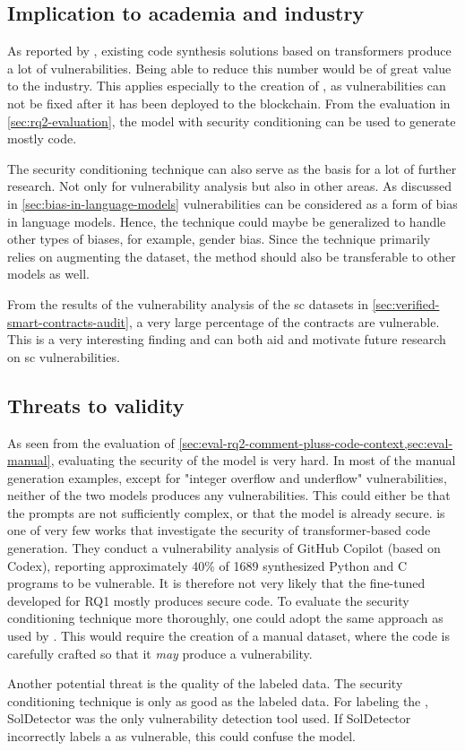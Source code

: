 \subsection{Implication to academia and industry}
\label{sec:rq2-implication-to-academia-industry}
As reported by \textcite{pearch2021asleep}, existing code synthesis solutions based on transformers produce a lot of vulnerabilities. Being able to reduce this number would be of great value to the industry. This applies especially to the creation of , as vulnerabilities can not be fixed after it has been deployed to the blockchain. From the evaluation in \cref{sec:rq2-evaluation}, the model with security conditioning can be used to generate  mostly  code.

The security conditioning technique can also serve as the basis for a lot of further research. Not only for vulnerability analysis but also in other areas. As discussed in \cref{sec:bias-in-language-models} vulnerabilities can be considered as a form of bias in language models. Hence, the technique could maybe be generalized to handle other types of biases, for example, gender bias. Since the technique primarily relies on augmenting the dataset, the method should also be transferable to other models as well.

From the results of the vulnerability analysis of the \acrshort{sc} datasets in \cref{sec:verified-smart-contracts-audit}, a very large percentage of the  contracts are vulnerable. This is a very interesting finding and can both aid and motivate future research on \acrshort{sc} vulnerabilities.

\subsection{Threats to validity}
\label{sec:rq2-threats-to-validity}
As seen from the evaluation of \cref{sec:eval-rq2-comment-pluss-code-context,sec:eval-manual}, evaluating the security of the model is very hard. In most of the manual generation examples, except for "integer overflow and underflow" vulnerabilities, neither of the two models produces any vulnerabilities. This could either be that the prompts are not sufficiently complex, or that the model is already secure. \textcite{pearch2021asleep} is one of very few works that investigate the security of transformer-based code generation. They conduct a vulnerability analysis of GitHub Copilot (based on Codex), reporting approximately 40\% of 1689 synthesized Python and C programs to be vulnerable. It is therefore not very likely that the fine-tuned developed for RQ1 mostly produces secure code. To evaluate the security conditioning technique more thoroughly, one could adopt the same approach as used by \cite{pearch2021asleep}. This would require the creation of a manual dataset, where the code is carefully crafted so that it \textit{may} produce a vulnerability.

Another potential threat is the quality of the labeled data. The security conditioning technique is only as good as the labeled data. For labeling the , SolDetector was the only vulnerability detection tool used. If SolDetector incorrectly labels a  as vulnerable, this could confuse the model.
